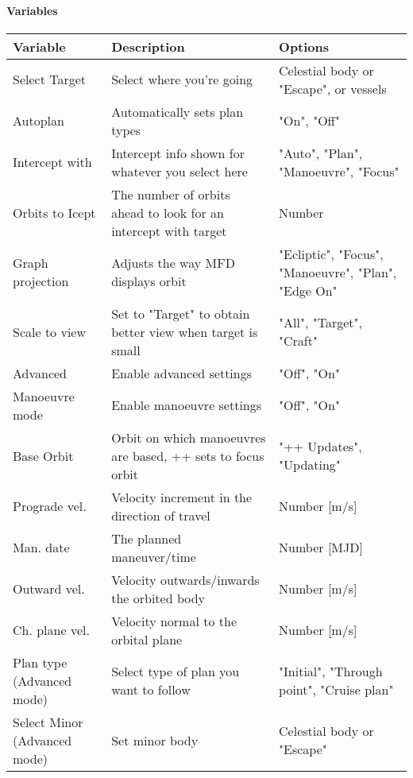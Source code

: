 \documentclass[Orbiter User Manual.tex]{subfiles}
\begin{document}
\paragraph{Variables}
	\begin{longtable}{ |p{}|p{}|p{}| }
	\hline\rule{0pt}{2ex}
	\textbf{Variable} & \textbf{Description} & \textbf{Options}\\
	\hline\rule{0pt}{2ex}
	Select Target & Select where you're going & Celestial body or "Escape", or vessels\\
	\hline\rule{0pt}{2ex}
	Autoplan & Automatically sets plan types & "On", "Off"\\
	\hline\rule{0pt}{2ex}
	Intercept with & Intercept info shown for whatever you select here & "Auto", "Plan", "Manoeuvre", "Focus"\\
	\hline\rule{0pt}{2ex}
	Orbits to Icept & The number of orbits ahead to look for an intercept with target & Number\\
	\hline\rule{0pt}{2ex}
	Graph projection & Adjusts the way MFD displays orbit & "Ecliptic", "Focus", "Manoeuvre", "Plan", "Edge On"\\
	\hline\rule{0pt}{2ex}
	Scale to view & Set to "Target" to obtain better view when target is small & "All", "Target", "Craft"\\
	\hline\rule{0pt}{2ex}
	Advanced & Enable advanced settings & "Off", "On"\\
	\hline\rule{0pt}{2ex}
	Manoeuvre mode & Enable manoeuvre settings & "Off", "On"\\
	\hline\rule{0pt}{2ex}
	Base Orbit & Orbit on which manoeuvres are based, ++ sets to focus orbit & "++ Updates", "Updating"\\
	\hline\rule{0pt}{2ex}
	Prograde vel. & Velocity increment in the direction of travel & Number [m/s]\\
	\hline\rule{0pt}{2ex}
	Man. date & The planned maneuver/time & Number [MJD]\\
	\hline\rule{0pt}{2ex}
	Outward vel. & Velocity outwards/inwards the orbited body & Number [m/s]\\
	\hline\rule{0pt}{2ex}
	Ch. plane vel. & Velocity normal to the orbital plane & Number [m/s]\\
	\hline\rule{0pt}{2ex}
	Plan type (Advanced mode) & Select type of plan you want to follow & "Initial", "Through point", "Cruise plan"\\
	\hline\rule{0pt}{2ex}
	Select Minor (Advanced mode) & Set minor body & Celestial body or "Escape"\\

\end{longtable}
\end{document}
